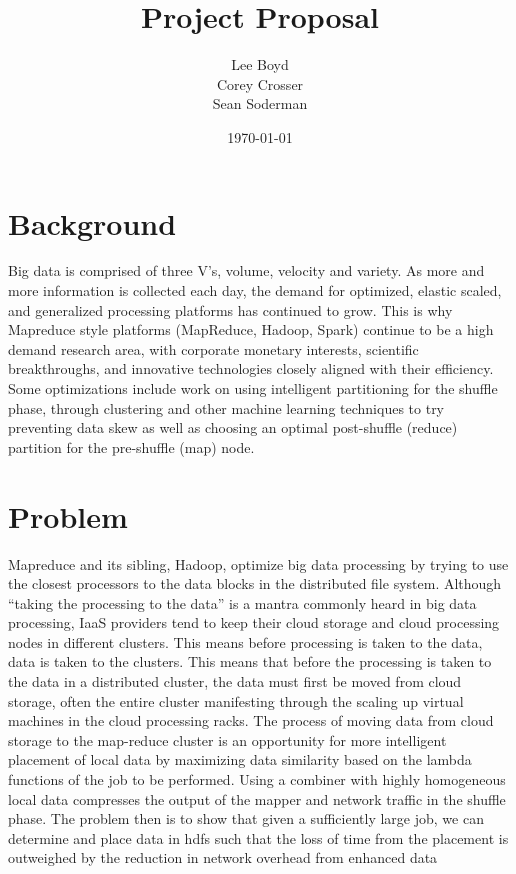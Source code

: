 \documentclass[12pt]{extarticle}
\begin{document}
\title{Project Proposal}
\author{Lee Boyd \\
        Corey Crosser \\
        Sean Soderman}
\date{\today}
\maketitle

\section{Background}
Big data is comprised of three V's, volume, velocity and variety. As more and more information is collected each day, the demand for optimized, elastic scaled, and generalized processing platforms has continued to grow. This is why Mapreduce style platforms (MapReduce, Hadoop, Spark) continue to be a high demand research area, with corporate monetary interests, scientific breakthroughs, and innovative technologies closely aligned with their efficiency.  Some optimizations include work on using intelligent partitioning for the shuffle phase, through clustering and other machine learning techniques to try preventing data skew as well as choosing an optimal post-shuffle (reduce) partition for the pre-shuffle (map) node.  


\section{Problem}
Mapreduce and its sibling, Hadoop, optimize big data processing by trying to use the closest processors to the data blocks in the distributed file system.  Although ``taking the processing to the data'' is a mantra commonly heard in big data processing, IaaS providers tend to keep their cloud storage and cloud processing nodes in different clusters. This means before processing is taken to the data, data is taken to the clusters.   
This means that before the processing is taken to the data in a distributed cluster, the data must first be moved from cloud storage, often the entire cluster manifesting through the scaling up virtual machines in the cloud processing racks.  The process of moving data from cloud storage to the map-reduce cluster is an opportunity for more intelligent placement of local data by maximizing data similarity based on the lambda functions of the job to be performed.  Using a combiner with highly homogeneous local data compresses the output of the mapper and network traffic in the shuffle phase.  The problem then is to show that given a sufficiently large job, we can determine and place data in hdfs such that the loss of time from the placement is outweighed by the reduction in network overhead from enhanced data 
\end{document}

